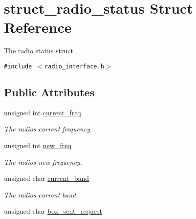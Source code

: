 \hypertarget{structstruct__radio__status}{
\section{struct\_\-radio\_\-status Struct Reference}
\label{structstruct__radio__status}
}
The radio status struct.  


{\tt \#include $<$radio\_\-interface.h$>$}

\subsection*{Public Attributes}
\begin{CompactItemize}
\item 
\hypertarget{structstruct__radio__status_3f8dc694c438cf71f8879c0fe661112a}{
unsigned int \hyperlink{structstruct__radio__status_3f8dc694c438cf71f8879c0fe661112a}{current\_\-freq}}
\label{structstruct__radio__status_3f8dc694c438cf71f8879c0fe661112a}

\begin{CompactList}\small\item\em The radios current frequency. \item\end{CompactList}\item 
\hypertarget{structstruct__radio__status_2c9df774ad90bd5f802868461bed9a6b}{
unsigned int \hyperlink{structstruct__radio__status_2c9df774ad90bd5f802868461bed9a6b}{new\_\-freq}}
\label{structstruct__radio__status_2c9df774ad90bd5f802868461bed9a6b}

\begin{CompactList}\small\item\em The radios new frequency. \item\end{CompactList}\item 
\hypertarget{structstruct__radio__status_51620d924d529240f096bb7df96c1f11}{
unsigned char \hyperlink{structstruct__radio__status_51620d924d529240f096bb7df96c1f11}{current\_\-band}}
\label{structstruct__radio__status_51620d924d529240f096bb7df96c1f11}

\begin{CompactList}\small\item\em The radios current band. \item\end{CompactList}\item 
unsigned char \hyperlink{structstruct__radio__status_b4b33389742d5abd41dfdc7cb8df71b8}{box\_\-sent\_\-request}
\end{CompactItemize}


